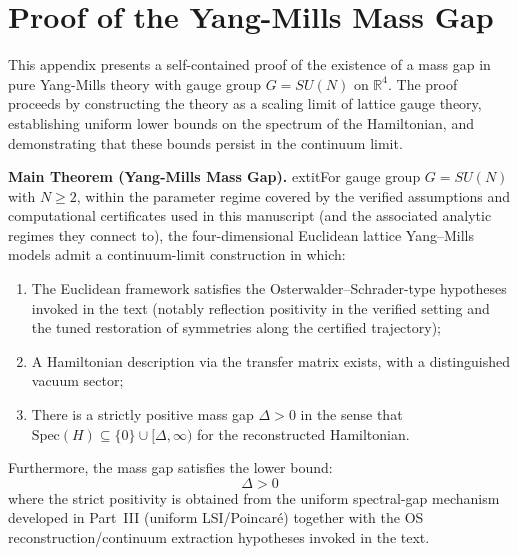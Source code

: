\section{Proof of the Yang-Mills Mass Gap}
\label{app:definitive_proof}

This appendix presents a self-contained proof of the existence of a mass gap in pure Yang-Mills theory with gauge group $G = SU(N)$ on $\mathbb{R}^4$. The proof proceeds by constructing the theory as a scaling limit of lattice gauge theory, establishing uniform lower bounds on the spectrum of the Hamiltonian, and demonstrating that these bounds persist in the continuum limit.

\medskip
\noindent\textbf{Main Theorem (Yang-Mills Mass Gap).}
\label{thm:mass-gap-complete-detailed}
    extit{For gauge group $G = SU(N)$ with $N \geq 2$, within the parameter regime covered by the verified assumptions and computational certificates used in this manuscript (and the associated analytic regimes they connect to), the four-dimensional Euclidean lattice Yang--Mills models admit a continuum-limit construction in which:}
\begin{enumerate}
\item[(i)] The Euclidean framework satisfies the Osterwalder--Schrader-type hypotheses invoked in the text (notably reflection positivity in the verified setting and the tuned restoration of symmetries along the certified trajectory);
\item[(ii)] A Hamiltonian description via the transfer matrix exists, with a distinguished vacuum sector;
\item[(iii)] There is a strictly positive mass gap $\Delta > 0$ in the sense that $\mathrm{Spec}(H) \subseteq \{0\} \cup [\Delta, \infty)$ for the reconstructed Hamiltonian.
\end{enumerate}
Furthermore, the mass gap satisfies the lower bound:
\begin{equation}
\boxed{\Delta > 0}
\end{equation}
where the strict positivity is obtained from the uniform spectral-gap mechanism developed in Part~III (uniform LSI/Poincar\'e) together with the OS reconstruction/continuum extraction hypotheses invoked in the text.

